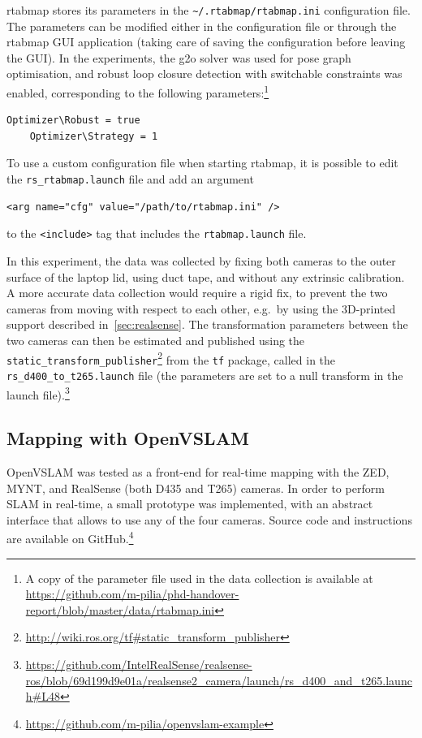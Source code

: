 \documentclass[11pt, letterpaper, twoside]{article}
\begin{document}
\gls{rtabmap} stores its parameters in the
\texttt{\textasciitilde/.rtabmap/rtabmap.ini} configuration file. The
parameters can be modified either in the configuration file or through the
\gls{rtabmap} GUI application (taking care of saving the configuration before
leaving the GUI). In the experiments, the g2o solver was used for pose graph
optimisation, and robust loop closure detection with switchable constraints was
enabled, corresponding to the following parameters:\footnote{A copy of the
    parameter file used in the data collection is available at
\url{https://github.com/m-pilia/phd-handover-report/blob/master/data/rtabmap.ini}}
\begin{Verbatim}[samepage=true]
    Optimizer\Robust = true
    Optimizer\Strategy = 1
\end{Verbatim}
To use a custom configuration file when starting \gls{rtabmap}, it is possible
to edit the \texttt{rs\_rtabmap.launch} file and add an argument
\begin{Verbatim}[samepage=true]
    <arg name="cfg" value="/path/to/rtabmap.ini" />
\end{Verbatim}
to the \texttt{<include>} tag that includes the \texttt{rtabmap.launch} file.

In this experiment, the data was collected by fixing both cameras to the outer
surface of the laptop lid, using duct tape, and without any extrinsic
calibration. A more accurate data collection would require a rigid fix, to
prevent the two cameras from moving with respect to each other, e.g.\ by using
the 3D-printed support described in~\cref{sec:realsense}. The transformation
parameters between the two cameras can then be estimated and published using
the
\texttt{static\_transform\_publisher}\footnote{\url{http://wiki.ros.org/tf\#static_transform_publisher}}
from the \texttt{tf} package, called in the \texttt{rs\_d400\_to\_t265.launch}
file (the parameters are set to a null transform in the launch
file).\footnote{\url{https://github.com/IntelRealSense/realsense-ros/blob/69d199d9e01a/realsense2_camera/launch/rs_d400_and_t265.launch\#L48}}

\subsection{Mapping with OpenVSLAM}\label{sec:openvslam-setup}

OpenVSLAM was tested as a front-end for real-time mapping with the ZED, MYNT,
and RealSense (both D435 and T265) cameras. In order to perform SLAM in
real-time, a small prototype was implemented, with an abstract interface that
allows to use any of the four cameras. Source code and instructions are
available on
GitHub.\footnote{\url{https://github.com/m-pilia/openvslam-example}}
\end{document}

